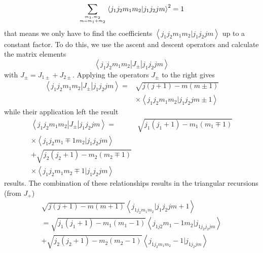 \begin{equation}
    \sum_{m_{1}, m_{2} \atop m=m_{1}+m_{2}}\left\langle j_{1} j_{2} m_{1} m_{2} | j_{1} j_{2} j m\right\rangle^{2}=1
\end{equation}
that means we only have to find the coefficients $\left\langle j_{1} j_{2} m_{1} m_{2} | j_{1} j_{2} j m\right\rangle$ up to a constant factor. To do this, we use the ascent and descent operators and calculate the matrix elements
\begin{equation}
    \left\langle j_{1} j_{2} m_{1} m_{2}\left|J_{\pm}\right| j_{1} j_{2} j m\right\rangle
    \end{equation}
with $J_{\pm}=J_{1 \pm}+J_{2 \pm}$. Applying the operators $J_{\pm}$ to the right gives
\begin{equation}
\begin{aligned}\left\langle j_{1} j_{2} m_{1} m_{2}\left|J_{\pm}\right| j_{1} j_{2} j m\right\rangle=& \sqrt{j(j+1)-m(m \pm 1)} \\ & \times\left\langle j_{1} j_{2} m_{1} m_{2} | j_{1} j_{2} j m \pm 1\right\rangle \end{aligned}
\end{equation}
while their application left the result
\begin{equation}
\begin{aligned}\left\langle j_{1} j_{2} m_{1} m_{2}\left|J_{\pm}\right| j_{1} j_{2} j m\right\rangle=& \sqrt{j_{1}\left(j_{1}+1\right)-m_{1}\left(m_{1} \mp 1\right)} \\ \times\left\langle j_{1} j_{2} m_{1} \mp 1 m_{2} | j_{1} j_{2} j m\right\rangle & \\+\sqrt{j_{2}\left(j_{2}+1\right)-m_{2}\left(m_{2} \mp 1\right)} & \\ \times\left\langle j_{1} j_{2} m_{1} m_{2} \mp 1 | j_{1} j_{2} j m\right\rangle \end{aligned}
\end{equation}
results. The combination of these relationships results in the triangular recursions (from $J_+$)
\begin{equation}
\begin{aligned} \sqrt{j(j+1)-m(m+1)}\left\langle j_{1 j_{2} m_{1} m_{2}} | j_{1} j_{2} j m+1\right\rangle \\=\sqrt{j_{1}\left(j_{1}+1\right)-m_{1}\left(m_{1}-1\right)}\left\langle j_{1 j 2} m_{1}-1 m_{2} | j_{1 j_{2} j_{2} j m}\right\rangle \\+\sqrt{j_{2}\left(j_{2}+1\right)-m_{2}\left(m_{2}-1\right)}\left\langle j_{1 j_{2} m_{1} m_{2}}-1 | j_{1 j_{2} j m}\right\rangle \end{aligned}
\end{equation}
